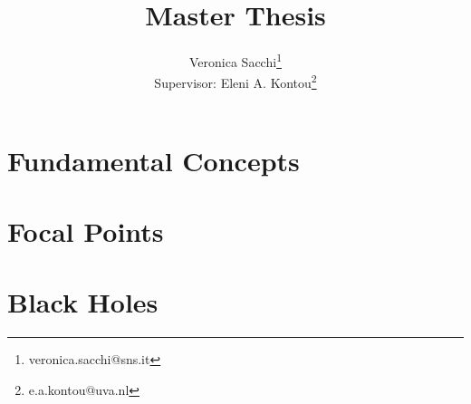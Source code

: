 \documentclass[12pt, a4paper]{book}
\title{Master Thesis}
\author{Veronica Sacchi\thanks{veronica.sacchi@sns.it}\\
Supervisor: Eleni A. Kontou\thanks{e.a.kontou@uva.nl}}
\begin{document}
\maketitle

\tableofcontents
\clearpage

\chapter{Fundamental Concepts}

\clearpage

\chapter{Focal Points}

\clearpage

\chapter{Black Holes}

\clearpage

\printbibliography
\end{document}
